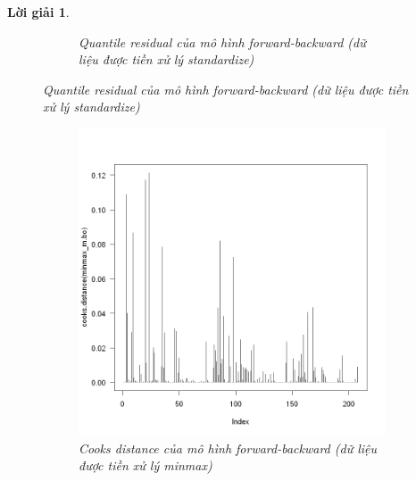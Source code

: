 \documentclass[14pt, a4paper]{article}
\theoremstyle{sltheorem}
\theoremstyle{soltheorem}
\newtheorem*{loigiai}{Lời giải}
\begin{document}
\begin{loigiai}
\begin{figure}[h!]
\begin{subfigure}[b]{0.4\textwidth}
            \caption{Quantile residual của mô hình forward-backward (dữ liệu được tiền xử lý standardize)}
        \end{subfigure}
        \label{fig:Quantile-resid-mbo}
    \end{figure}

    \begin{figure}[h!]
        \centering
        \begin{subfigure}[b]{0.4\textwidth}
            \centering
            \includegraphics[width=\textwidth]{figures/minmax_mbo_cooks.png}
            \caption{Cooks distance của mô hình forward-backward (dữ liệu được tiền xử lý minmax)}
        \end{subfigure}
        \hfill
        \begin{subfigure}[b]{0.4\textwidth}
            \centering

\end{subfigure}
\end{figure}
\end{loigiai}
\end{document}
